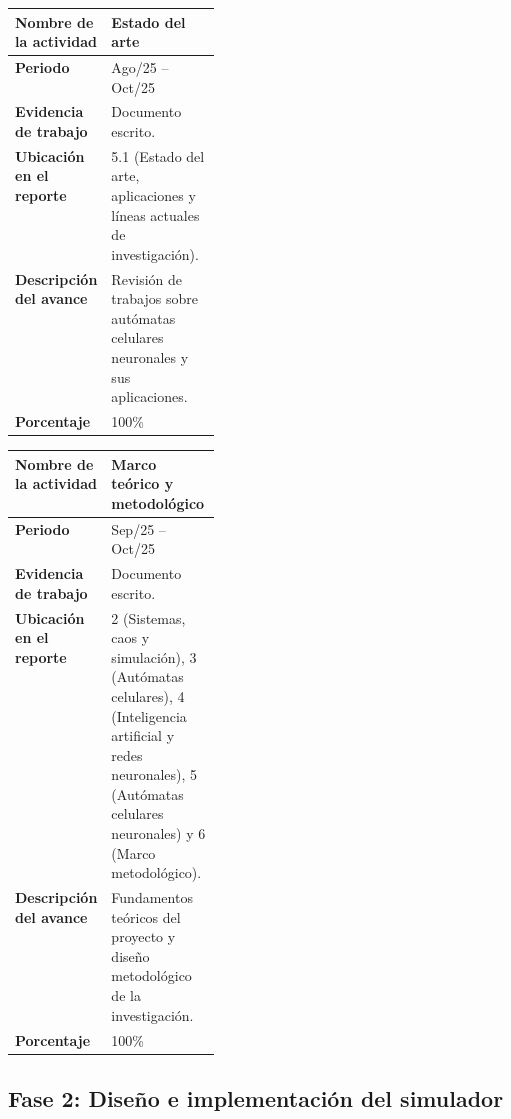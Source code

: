 \documentclass[letterpaper,10pt,oneside]{article}
\begin{document}
	\begin{table}[H]
		\centering
		\renewcommand{\arraystretch}{1.25}
		\begin{tabularx}{\linewidth}{|>{\raggedright\bfseries\arraybackslash}p{0.24\linewidth}|X|}
			\hline
			\rowcolor{encabezado}
			Nombre de la actividad & \textbf{Estado del arte} \\ \hline
			Periodo & Ago/25 -- Oct/25 \\ \hline
			Evidencia de trabajo & Documento escrito. \\ \hline
			Ubicación en el reporte & 5.1 (Estado del arte, aplicaciones y líneas actuales de investigación). \\ \hline
			Descripción del avance & Revisión de trabajos sobre autómatas celulares neuronales y sus aplicaciones. \\ \hline
			Porcentaje & 100\% \\ \hline
		\end{tabularx}
	\end{table}

	\begin{table}[H]
		\centering
		\renewcommand{\arraystretch}{1.25}
		\begin{tabularx}{\linewidth}{|>{\raggedright\bfseries\arraybackslash}p{0.24\linewidth}|X|}
			\hline
			\rowcolor{encabezado}
			Nombre de la actividad & \textbf{Marco teórico y metodológico} \\ \hline
			Periodo & Sep/25 -- Oct/25 \\ \hline
			Evidencia de trabajo & Documento escrito. \\ \hline
			Ubicación en el reporte & 2 (Sistemas, caos y simulación), 3 (Autómatas celulares), 4 (Inteligencia artificial y redes neuronales), 5 (Autómatas celulares neuronales) y 6 (Marco metodológico). \\ \hline
			Descripción del avance & Fundamentos teóricos del proyecto y diseño metodológico de la investigación. \\ \hline
			Porcentaje & 100\% \\ \hline
		\end{tabularx}
	\end{table}

	\subsection*{Fase 2: Diseño e implementación del simulador}
\end{document}
